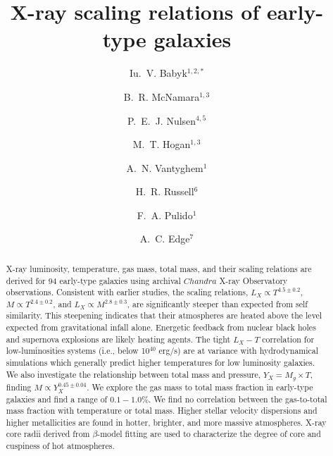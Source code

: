 \documentclass[iop]{emulateapj}
\begin{document}
\title{X-ray scaling relations of early-type galaxies}
\author{Iu.~V. Babyk$^{1,2,\ast}$}
\author{B.~R. McNamara$^{1,3}$}
\author{P.~E.~J. Nulsen$^{4,5}$}
\author{M.~T. Hogan$^{1,3}$}
\author{A.~N. Vantyghem$^{1}$}
\author{H.~R. Russell$^{6}$}
\author{F.~A. Pulido$^{1}$}
\author{A.~C. Edge$^{7}$}



%
%

\begin{abstract}
\hspace{0.5cm} X-ray luminosity, temperature, gas mass, total mass, and their scaling relations are derived for 94 early-type galaxies using archival $Chandra$ X-ray Observatory observations. Consistent with earlier studies, the scaling relations, $L_X \propto T^{4.5\pm0.2}$, $M \propto T^{2.4\pm0.2}$, and $L_X \propto M^{2.8\pm0.3}$,  are significantly steeper than expected from  self similarity.  This steepening indicates that their atmospheres are heated above the level expected from gravitational infall alone.  Energetic feedback from nuclear black holes and supernova explosions are likely heating agents. The tight $L_X - T$ correlation for low-luminosities systems (i.e., below 10$^{40}$ erg/s) are at variance with hydrodynamical simulations which generally predict higher temperatures for low luminosity galaxies. We also investigate the relationship between total mass and pressure, $Y_X = M_g \times T$, finding $M \propto Y_{X}^{0.45\pm0.04}$. We explore the gas mass to total mass fraction in early-type galaxies and find a range of $0.1-1.0\%$. We find no correlation between the gas-to-total mass fraction with temperature or total mass. Higher stellar velocity dispersions and higher metallicities are found in hotter, brighter, and more massive atmospheres. X-ray core radii derived from $\beta$-model fitting are used to characterize the degree of core and cuspiness of hot atmospheres.
\end{abstract}
\end{document}
